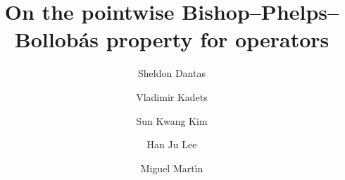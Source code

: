 \documentclass[a4paper,10pt]{amsart}
\theoremstyle{plain}
\theoremstyle{definition}
\begin{document}
\title{On the pointwise Bishop--Phelps--Bollob\'as property for operators}




\author[Dantas]{Sheldon Dantas}
\address[Dantas]{Department of Mathematics, Faculty of Electrical Engineering, Czech Technical University in Prague, Technick\'a 2, 166 27 Prague 6, Czech Republic \newline
\href{http://orcid.org/0000-0001-8117-3760}{ORCID: \texttt{0000-0001-8117-3760}  }}

\author[Kadets]{Vladimir Kadets}
\address[Kadets]{School of Mathematics and Computer Sciences \\
V. N. Karazin Kharkiv National University \\ pl.~Svobody~4 \\
61022~Kharkiv \\ Ukraine
\newline
\href{http://orcid.org/0000-0002-5606-2679}{ORCID: \texttt{0000-0002-5606-2679} }
}



\author[Kim]{Sun Kwang Kim}
\address[Kim]{Department of Mathematics, Chungbuk National University, 1 Chungdae-ro, Seowon-Gu, Cheongju,
Chungbuk 28644, Republic of Korea \newline
\href{http://orcid.org/0000-0002-9402-2002}{ORCID: \texttt{0000-0002-9402-2002}  }}

\author[Lee]{Han Ju Lee}
\address[Lee]{Department of Mathematics Education, Dongguk University - Seoul, 04620 (Seoul), Republic of Korea \newline
\href{http://orcid.org/0000-0001-9523-2987}{ORCID: \texttt{0000-0001-9523-2987}  }
}


\author[Mart\'{\i}n]{Miguel Mart\'{\i}n}
\address[Mart\'{\i}n]{Departamento de An\'{a}lisis Matem\'{a}tico, Facultad de
 Ciencias, Universidad de Granada, 18071 Granada, Spain \newline
\href{http://orcid.org/0000-0003-4502-798X}{ORCID: \texttt{0000-0003-4502-798X} }
 }
\end{document}
